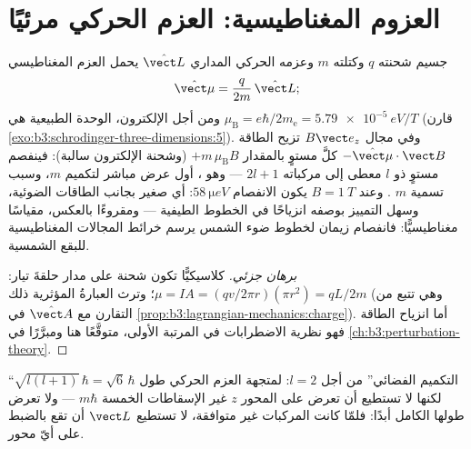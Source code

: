 \section{العزوم المغناطيسية: العزم الحركي مرئيًا}

\begin{proposition}\label{prop:b3:quantum-angular-momentum:magnetic}
جسيم شحنته $q$ وكتلته $m$ وعزمه الحركي المداري
$\hat{\vect L}$ يحمل العزم المغناطيسي
\[
\hat{\vect\mu} = \frac{q}{2m}\,\hat{\vect L} ;
\]
ومن أجل الإلكترون، الوحدة الطبيعية هي \emph{}
$\mu_{\text{B}} = e\hbar/2m_{\text{e}} = \qty{5.79e-5}{eV/T}$
(قارن \cref{exo:b3:schrodinger-three-dimensions:5}). وفي مجال
$B\vect e_z$ تزيح الطاقة $-\hat{\vect\mu}\cdot\vect B$ كلَّ
مستوٍ بالمقدار $+m\,\mu_{\text{B}}B$ (وشحنة الإلكترون سالبة): فينفصم مستوٍ
ذو $l$ معطى إلى مركباته $2l + 1$ --- وهو
\emph{}، أول عرض مباشر لتكميم
$m$، وسبب تسمية $m$ .
وعند $B = \qty{1}{T}$ يكون الانفصام $\qty{58}{\micro eV}$: أي صغير
بجانب الطاقات الضوئية، وسهل التمييز بوصفه انزياحًا في الخطوط
الطيفية --- ومقروءًا بالعكس، مقياسًا مغناطيسيًّا: فانفصام زيمان
لخطوط ضوء الشمس يرسم خرائط المجالات المغناطيسية للبقع الشمسية.
\end{proposition}

\begin{proof}[برهان جزئي]
كلاسيكيًّا تكون شحنة على مدار حلقةَ تيار: $\mu = IA =
(qv/2\pi r)(\pi r^2) = qL/2m$؛ وترث العبارةُ المؤثرية ذلك
(وهي تتبع من التقارن مع $\hat{\vect A}$ في
\cref{prop:b3:lagrangian-mechanics:charge}). أما انزياح الطاقة فهو
نظرية الاضطرابات في المرتبة الأولى، متوقَّعًا هنا ومبرَّرًا في
\cref{ch:b3:perturbation-theory}.
\end{proof}

\begin{omfigure}

{\small ``التكميم الفضائي'' من أجل $l = 2$: لمتجهة العزم الحركي
طول $\sqrt{l(l+1)}\,\hbar = \sqrt6\,\hbar$ لكنها لا تستطيع أن
تعرض على المحور $z$ غير الإسقاطات الخمسة $m\hbar$ --- ولا تعرض
طولها الكامل أبدًا: فلمّا كانت المركبات غير متوافقة، لا تستطيع
$\vect L$ أن تقع بالضبط على أيّ محور.}
\end{omfigure}

